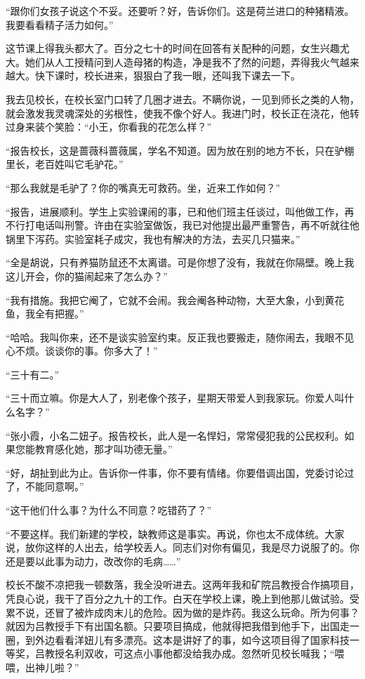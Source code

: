  “跟你们女孩子说这个不妥。还要听？好，告诉你们。这是荷兰进口的种猪精液。我要看看精子活力如何。” 
 
 这节课上得我头都大了。百分之七十的时间在回答有关配种的问题，女生兴趣尤大。她们从人工授精问到人造母猪的构造，净是我不了然的问题，弄得我火气越来越大。快下课时，校长进来，狠狠白了我一眼，还叫我下课去一下。 
 
 我去见校长，在校长室门口转了几圈才进去。不瞒你说，一见到师长之类的人物，就会激发我灵魂深处的劣根性，使我不像个好人。我进门时，校长正在浇花，他转过身来装个笑脸：“小王，你看我的花怎么样？” 
 
 “报告校长，这是蔷薇科蔷薇属，学名不知道。因为放在别的地方不长，只在驴棚里长，老百姓叫它毛驴花。” 
 
 “那么我就是毛驴了？你的嘴真无可救药。坐，近来工作如何？” 
 
 “报告，进展顺利。学生上实验课闹的事，已和他们班主任谈过，叫他做工作，再不行打电话叫刑警。许由在实验室做饭，我已对他提出最严重警告，再不听就往他锅里下泻药。实验室耗子成灾，我也有解决的方法，去买几只猫来。” 
 
 “全是胡说，只有养猫防鼠还不太离谱。可是你想了没有，我就在你隔壁。晚上我这儿开会，你的猫闹起来了怎么办？” 
 
 “我有措施。我把它阉了，它就不会闹。我会阉各种动物，大至大象，小到黄花鱼，我全有把握。” 
 
 “哈哈。我叫你来，还不是谈实验室约束。反正我也要搬走，随你闹去，我眼不见心不烦。谈谈你的事。你多大了！” 
 
 “三十有二。” 
 
 “三十而立嘛。你是大人了，别老像个孩子，星期天带爱人到我家玩。你爱人叫什么名字？” 
 
 “张小霞，小名二妞子。报告校长，此人是一名悍妇，常常侵犯我的公民权利。如果您能教育感化她，那才叫功德无量。” 
 
 “好，胡扯到此为止。告诉你一件事，你不要有情绪。你要借调出国，党委讨论过了，不能同意啊。” 
 
 “这干他们什么事？为什么不同意？吃错药了？” 
 
 “不要这样。我们新建的学校，缺教师这是事实。再说，你也太不成体统。大家说，放你这样的人出去，给学校丢人。同志们对你有偏见，我是尽力说服了的。你还是要以此事为动力，改改你的毛病……” 
 
 校长不酸不凉把我一顿数落，我全没听进去。这两年我和矿院吕教授合作搞项目，凭良心说，我干了百分之九十的工作。白天在学校上课，晚上到他那儿做试验。受累不说，还冒了被炸成肉末儿的危险。因为做的是炸药。我这么玩命。所为何事？就因为吕教授手下有出国名额。只要项目搞成，他就得把我借到他手下，出国走一圈，到外边看看洋妞儿有多漂亮。这本是讲好了的事，如今这项目得了国家科技一等奖，吕教授名利双收，可这点小事他都没给我办成。忽然听见校长喊我；“喂喂，出神儿啦？” 
 
